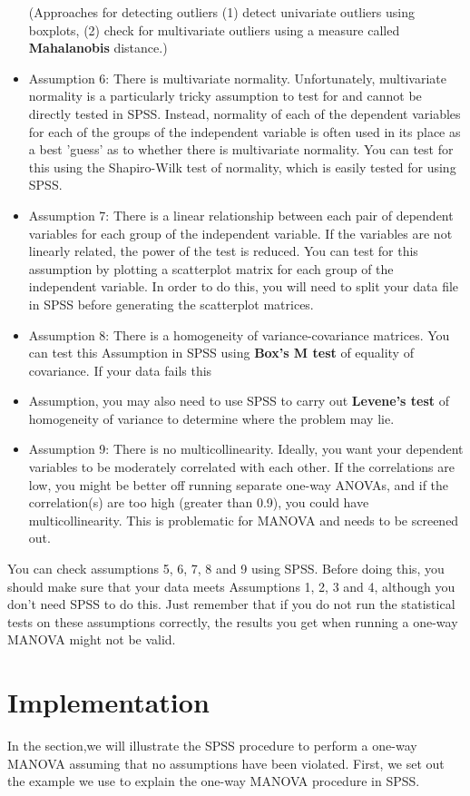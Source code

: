 \documentclass[12pt]{article} %
\begin{document}
\begin{itemize}
    (Approaches for detecting outliers (1) detect univariate outliers using boxplots,  (2) check for multivariate outliers using a measure called \textbf{Mahalanobis} distance.)

\item Assumption 6: There is multivariate normality. Unfortunately, multivariate normality is a particularly tricky assumption to test for and cannot be directly tested in SPSS. Instead, normality of each of the dependent variables for each of the groups of the independent variable is often used in its place as a best 'guess' as to whether there is multivariate normality. You can test for this using the Shapiro-Wilk test of normality, which is easily tested for using SPSS. \\

\item Assumption 7: There is a linear relationship between each pair of dependent variables for each group of the independent variable. If the variables are not linearly related, the power of the test is reduced. You can test for this  assumption by plotting a scatterplot matrix for each group of the independent variable. In order to do this, you will need to split your data file in SPSS before generating the scatterplot matrices.
\item Assumption 8: There is a homogeneity of variance-covariance matrices. You can test this Assumption in SPSS using \textbf{Box's M test} of equality of covariance. If your data fails this \item Assumption, you may also need to use SPSS to carry out \textbf{Levene's test} of homogeneity of variance to determine where the problem may lie.
\item Assumption 9: There is no multicollinearity. Ideally, you want your dependent variables to be moderately correlated with each other. If the correlations are low, you might be better off running separate one-way ANOVAs, and if the correlation(s) are too high (greater than 0.9), you could have multicollinearity. This is problematic for MANOVA and needs to be screened out.
\end{itemize}

You can check assumptions 5, 6, 7, 8 and 9 using SPSS. Before doing this, you should make sure that your data meets Assumptions 1, 2, 3 and 4, although you don't need SPSS to do this. Just remember that if you do not run the statistical tests on these assumptions correctly, the results you get when running a one-way MANOVA might not be valid.
\newpage
\section{Implementation}
In the section,we will illustrate the SPSS procedure to perform a one-way MANOVA assuming that no assumptions have been violated. First, we set out the example we use to explain the one-way MANOVA procedure in SPSS.
\end{document}
